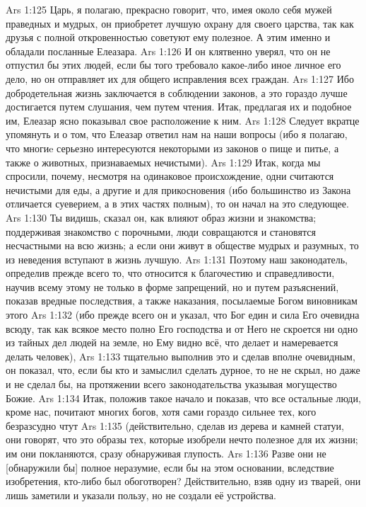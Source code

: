 \vs Ars 1:125
Царь, я полагаю, прекрасно говорит, что, имея около себя мужей праведных и мудрых, он приобретет лучшую охрану для своего царства, так как друзья с полной откровенностью советуют ему полезное. А этим именно и обладали посланные Елеазара.
\vs Ars 1:126
И он клятвенно уверял, что он не отпустил бы этих людей, если бы того требовало какое-либо иное личное его дело, но он отправляет их для общего исправления всех граждан.
\vs Ars 1:127
Ибо добродетельная жизнь заключается в соблюдении законов, а это гораздо лучше достигается путем слушания, чем путем чтения. Итак, предлагая их и подобное им, Елеазар ясно показывал свое расположение к ним.
\vs Ars 1:128
Следует вкратце упомянуть и о том, что Елеазар ответил нам на наши вопросы (ибо я полагаю, что многиe серьезно интересуются некоторыми из законов о пище и питье, а также о животных, признаваемых нечистыми).
\vs Ars 1:129
Итак, когда мы спросили, почему, несмотря на одинаковое происхождение, одни считаются нечистыми для еды, а другие и для прикосновения (ибо большинство из Закона отличается суеверием, а в этих частях полным), то он начал на это следующее.
\vs Ars 1:130
Ты видишь, сказал он, как влияют образ жизни и знакомства; поддерживая знакомство с порочными, люди совращаются и становятся несчастными на всю жизнь; а если они живут в обществе мудрых и разумных, то из неведения вступают в жизнь лучшую.
\vs Ars 1:131
Поэтому наш законодатель, определив прежде всего то, что относится к благочестию и справедливости, научив всему этому не только в форме запрещений, но и путем разъяснений, показав вредные последствия, а также наказания, посылаемые Богом виновникам этого
\vs Ars 1:132
(ибо прежде всего он и указал, что Бог един и сила Его очевидна всюду, так как всякое место полно Его господства и от Него не скроется ни одно из тайных дел людей на земле, но Ему видно всё, что делает и намеревается делать человек),
\vs Ars 1:133
тщательно выполнив это и сделав вполне очевидным, он показал, что, если бы кто и замыслил сделать дурное, то не не скрыл, но даже и не сделал бы, на протяжении всего законодательства указывая могущество Божие.
\vs Ars 1:134
Итак, положив такое начало и показав, что все остальные люди, кроме нас, почитают многих богов, хотя сами гораздо сильнее тех, кого безразсудно чтут
\vs Ars 1:135
(действительно, сделав из дерева и камней статуи, они говорят, что это образы тех, которые изобрели нечто полезное для их жизни; им они покланяются, сразу обнаруживая глупость.
\vs Ars 1:136
Разве они не [обнаружили бы] полное неразумие, если бы на этом основании, вследствие изобретения, кто-либо был обоготворен? Действительно, взяв одну из тварей, они лишь заметили и указали пользу, но не создали её устройства.
